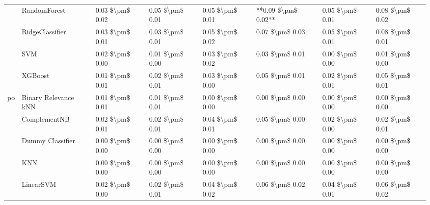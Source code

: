 \begin{tabular}{llllllll}
   & RandomForest &  0.03 \$\textbackslash pm\$ 0.02 &           0.05 \$\textbackslash pm\$ 0.01 &       0.05 \$\textbackslash pm\$ 0.01 &    **0.09 \$\textbackslash pm\$ 0.02** &                         0.05 \$\textbackslash pm\$ 0.01 &      0.08 \$\textbackslash pm\$ 0.02 \\
   & RidgeClassifier &  0.03 \$\textbackslash pm\$ 0.01 &           0.03 \$\textbackslash pm\$ 0.01 &       0.05 \$\textbackslash pm\$ 0.02 &        0.07 \$\textbackslash pm\$ 0.03 &                         0.05 \$\textbackslash pm\$ 0.01 &      0.08 \$\textbackslash pm\$ 0.01 \\
   & SVM &  0.02 \$\textbackslash pm\$ 0.00 &           0.01 \$\textbackslash pm\$ 0.00 &       0.03 \$\textbackslash pm\$ 0.02 &        0.03 \$\textbackslash pm\$ 0.01 &                         0.00 \$\textbackslash pm\$ 0.00 &      0.01 \$\textbackslash pm\$ 0.00 \\
   & XGBoost &  0.01 \$\textbackslash pm\$ 0.01 &           0.02 \$\textbackslash pm\$ 0.01 &       0.03 \$\textbackslash pm\$ 0.00 &        0.05 \$\textbackslash pm\$ 0.01 &                         0.02 \$\textbackslash pm\$ 0.01 &      0.05 \$\textbackslash pm\$ 0.01 \\
po & Binary Relevance kNN &  0.01 \$\textbackslash pm\$ 0.01 &           0.01 \$\textbackslash pm\$ 0.01 &       0.00 \$\textbackslash pm\$ 0.00 &        0.00 \$\textbackslash pm\$ 0.00 &                         0.00 \$\textbackslash pm\$ 0.00 &      0.00 \$\textbackslash pm\$ 0.00 \\
   & ComplementNB &  0.02 \$\textbackslash pm\$ 0.01 &           0.02 \$\textbackslash pm\$ 0.01 &       0.04 \$\textbackslash pm\$ 0.01 &        0.05 \$\textbackslash pm\$ 0.00 &                         0.02 \$\textbackslash pm\$ 0.00 &      0.02 \$\textbackslash pm\$ 0.01 \\
   & Dummy Classifier &  0.00 \$\textbackslash pm\$ 0.00 &           0.00 \$\textbackslash pm\$ 0.00 &       0.00 \$\textbackslash pm\$ 0.00 &        0.00 \$\textbackslash pm\$ 0.00 &                         0.00 \$\textbackslash pm\$ 0.00 &      0.00 \$\textbackslash pm\$ 0.00 \\
   & KNN &  0.00 \$\textbackslash pm\$ 0.00 &           0.00 \$\textbackslash pm\$ 0.00 &       0.00 \$\textbackslash pm\$ 0.00 &        0.00 \$\textbackslash pm\$ 0.00 &                         0.00 \$\textbackslash pm\$ 0.00 &      0.00 \$\textbackslash pm\$ 0.00 \\
   & LinearSVM &  0.02 \$\textbackslash pm\$ 0.00 &           0.02 \$\textbackslash pm\$ 0.01 &       0.04 \$\textbackslash pm\$ 0.02 &        0.06 \$\textbackslash pm\$ 0.02 &                         0.04 \$\textbackslash pm\$ 0.01 &      0.06 \$\textbackslash pm\$ 0.02 \\

\end{tabular}
